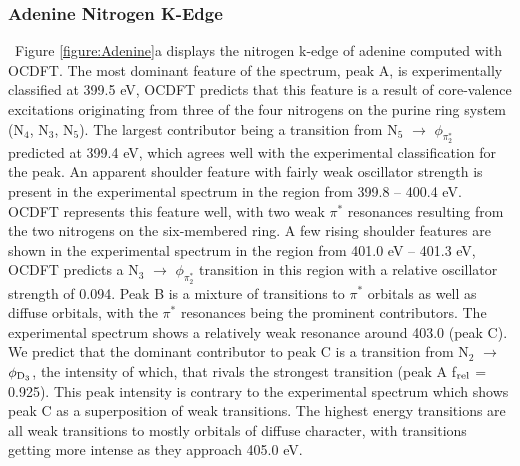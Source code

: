 \documentclass[8.5pt,twoside,twocolumn]{article}
\begin{document}
\subsubsection{Adenine Nitrogen K-Edge}
   \ Figure \ref{figure:Adenine}a displays the nitrogen k-edge of adenine computed with OCDFT. The most dominant feature of the spectrum, peak A, is experimentally classified at 399.5 eV, OCDFT predicts that this feature is a result of core-valence excitations originating from three of the four nitrogens on the purine ring system (N$_4$, N$_3$, N$_5$). The largest contributor being a transition from N$_5$ $\rightarrow$ $\phi_{\pi_2^*}$ predicted at 399.4 eV, which agrees well with the experimental classification for the peak. An apparent shoulder feature with fairly weak oscillator strength is present in the experimental spectrum in the region from 399.8 -- 400.4 eV. OCDFT represents this feature well, with two weak $\pi^*$ resonances resulting from the two nitrogens on the six-membered ring. A few rising shoulder features are shown in the experimental spectrum in the region from 401.0 eV -- 401.3 eV, OCDFT predicts a N$_3$ $\rightarrow$ $\phi_{\pi_2^*}$ transition in this region with a relative oscillator strength of 0.094. Peak B is a mixture of transitions to $\pi^*$ orbitals as well as diffuse orbitals, with the $\pi^*$ resonances being the prominent contributors. 
The experimental spectrum shows a relatively weak resonance around 403.0 (peak C).  We predict that the dominant contributor to peak C is a transition from N$_2$ $\rightarrow$ $\phi_{\rm D_3}$, the intensity of which, that rivals the strongest transition (peak A f$_{\rm rel}$ = 0.925). This peak intensity is contrary to the experimental spectrum which shows peak C  as a superposition of weak transitions. The highest energy transitions are all weak transitions to mostly orbitals of diffuse character, with transitions getting more intense as they approach 405.0 eV. 
\end{document}
